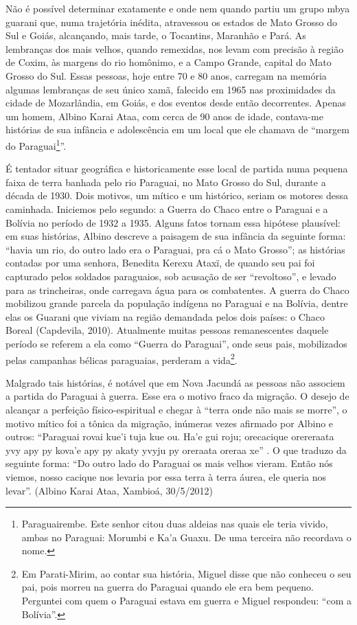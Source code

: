 {{Não é possível determinar exatamente e onde nem quando partiu um grupo
mbya guarani que, numa trajetória inédita, atravessou os estados de
Mato Grosso do Sul e Goiás, alcançando, mais tarde, o Tocantins,
Maranhão e Pará. As lembranças dos mais velhos, quando remexidas, nos
levam com precisão à região de Coxim, às margens do rio homônimo, e a
Campo Grande, capital do Mato Grosso do Sul. Essas pessoas, hoje entre
70 e 80 anos, carregam na memória algumas lembranças de seu único xamã,
falecido em 1965 nas proximidades da cidade de Mozarlândia, em Goiás, e
dos eventos desde então decorrentes. Apenas um homem, Albino Karai
Ataa, com cerca de 90 anos de idade, contava-me histórias de sua
infância e adolescência em um local que ele chamava de ``margem do
Paraguai\footnote{Paraguairembe. Este senhor citou duas aldeias nas
quais ele teria vivido, ambas no Paraguai: Morumbi e Ka’a Guaxu. De uma
terceira não recordava o nome.}''. 

É tentador situar geográfica e historicamente esse local de partida numa
pequena faixa de terra banhada pelo rio Paraguai, no Mato Grosso do
Sul, durante a década de 1930. Dois motivos, um mítico e um histórico,
seriam os motores dessa caminhada. Iniciemos pelo segundo: a Guerra do
Chaco entre o Paraguai e a Bolívia no período de 1932 a 1935. Alguns
fatos tornam essa hipótese plausível: em suas histórias, Albino
descreve a paisagem de sua infância da seguinte forma: ``havia um rio,
do outro lado era o Paraguai, pra cá o Mato Grosso''; as histórias
contadas por uma senhora, Benedita Kerexu Ataxï, de quando seu pai foi
capturado pelos soldados paraguaios, sob acusação de ser ``revoltoso'', e
levado para as trincheiras, onde carregava água para os combatentes. A
guerra do Chaco mobilizou grande parcela da população indígena no
Paraguai e na Bolívia, dentre elas os Guarani que viviam na região
demandada pelos dois países: o Chaco Boreal (Capdevila, 2010).
Atualmente muitas pessoas remanescentes daquele período se referem a
ela como ``Guerra do Paraguai'', onde seus pais, mobilizados pelas
campanhas bélicas paraguaias, perderam a vida\footnote{Em Parati-Mirim,
ao contar sua história, Miguel disse que não conheceu o seu pai, pois
morreu na guerra do Paraguai quando ele era bem pequeno. Perguntei com
quem o Paraguai estava em guerra e Miguel respondeu: ``com a Bolívia''.}.

Malgrado tais histórias, é notável que em Nova Jacundá as pessoas não
associem a partida do Paraguai à guerra. Esse era o motivo fraco da
migração. O desejo de alcançar a perfeição físico-espiritual e chegar à
``terra onde não mais se morre'', o motivo mítico foi a tônica da
migração, inúmeras vezes afirmado por Albino e outros: ``Paraguai rovai
kue’i tuja kue ou. Ha’e gui roju; orecacique orereraata yvy apy py
kova’e apy py akaty yvyju py oreraata oreraa xe'' . O que traduzo da
seguinte forma: ``Do outro lado do Paraguai os mais velhos vieram. Então
nós viemos, nosso cacique nos levaria por essa terra à terra áurea, ele
queria nos levar''. (Albino Karai Ataa,  Xambioá, 30/5/2012)

}}
